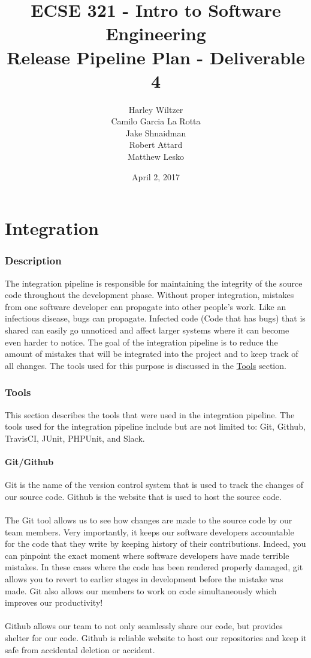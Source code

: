 \documentclass[12pt]{report}
\title{ECSE 321 - Intro to Software Engineering\\Release Pipeline Plan - Deliverable 4}
\author{Harley Wiltzer\\Camilo Garcia La Rotta\\Jake Shnaidman\\Robert Attard\\Matthew Lesko}
\date{April 2, 2017}
\begin{document}
\maketitle
\newpage
{} %
\tableofcontents
\part{Integration}
\section{Description}
The integration pipeline is responsible for maintaining the integrity of the source code throughout the development phase. Without proper integration, mistakes from one software developer can propagate into other people's work. Like an infectious disease, bugs can propagate. Infected code (Code that has bugs) that is shared can easily go unnoticed and affect larger systems where it can become even harder to notice. The goal of the integration pipeline is to reduce the amount of mistakes that will be integrated into the project and to keep track of all changes. The tools used for this purpose is discussed in the \hyperref[s:integration-tools]{Tools} section.
\section{Tools}
\label{s:integration-tools}
This section describes the tools that were used in the integration pipeline. The tools used for the integration pipeline include but are not limited to: Git, Github, TravisCI, JUnit, PHPUnit, and Slack.

\subsection{Git/Github}
Git is the name of the version control system that is used to track the changes of our source code. Github is the website that is used to host the source code. \\\\
The Git tool allows us to see how changes are made to the source code by our team members. Very importantly, it keeps our software developers accountable for the code that they write by keeping history of their contributions. Indeed, you can pinpoint the exact moment where software developers have made terrible mistakes. In these cases where the code has been rendered properly damaged, git allows you to revert to earlier stages in development before the mistake was made. Git also allows our members to work on code simultaneously which improves our productivity!\\\\
Github allows our team to not only seamlessly share our code, but provides shelter for our code. Github is reliable website to host our repositories and keep it safe from accidental deletion or accident.
\end{document}
